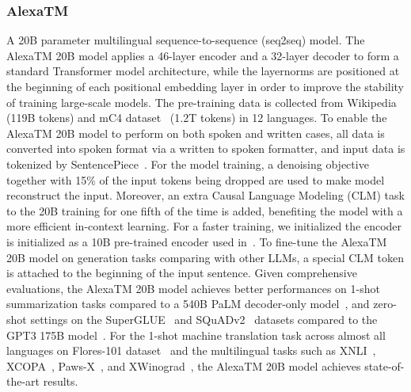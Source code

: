 \subsubsection{AlexaTM~\cite{soltan2022alexatm}}
A 20B parameter multilingual sequence-to-sequence (seq2seq) model. The AlexaTM 20B model applies a 46-layer encoder and a 32-layer decoder to form a standard Transformer model architecture, while the layernorms are positioned at the beginning of each positional embedding layer in order to improve the stability of training large-scale models. The pre-training data is collected from Wikipedia (119B tokens) and mC4 dataset~\cite{mT5} (1.2T tokens) in 12 languages. To enable the AlexaTM 20B model to perform on both spoken and written cases, all data is converted into spoken format via a written to spoken formatter, and input data is tokenized by SentencePiece~\cite{kudo2018sentencepiece}. For the model training, a denoising objective together with 15\% of the input tokens being dropped are used to make model reconstruct the input. Moreover, an extra Causal Language Modeling (CLM) task to the 20B training for one fifth of the time is added, benefiting the model with a more efficient in-context learning. For a faster training, we initialized the encoder is initialized as a 10B pre-trained encoder used in~\cite{fitzgerald2022alexa}. To fine-tune the AlexaTM 20B model on generation tasks comparing with other LLMs, a special CLM token is attached to the beginning of the input sentence. Given comprehensive evaluations, the AlexaTM 20B model achieves better performances on 1-shot summarization tasks compared to a 540B PaLM decoder-only model~\cite{chowdhery2022palm}, and zero-shot settings on the SuperGLUE~\cite{wang2019superglue} and SQuADv2~\cite{rajpurkar2018know} datasets compared to the GPT3 175B model~\cite{GPT-3}. For the 1-shot machine translation task across almost all languages on Flores-101 dataset~\cite{goyal2022flores} and the multilingual tasks such as XNLI~\cite{conneau2018xnli}, XCOPA~\cite{ponti2020xcopa}, Paws-X~\cite{yang2019paws}, and XWinograd~\cite{tikhonov2021s}, the AlexaTM 20B model achieves state-of-the-art results.
